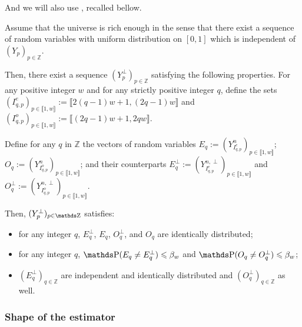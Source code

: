 And we will also use , recalled bellow.
\begin{lm*}
Assume that the universe is rich enough in the sense that there exist a sequence of random variables with uniform distribution on $[0,1]$ which is independent of $(Y_{p})_{p \in \mathds{Z}}$.

Then, there exist a sequence $(Y_{p}^{\perp})_{p \in \mathds{Z}}$ satisfying the following properties.
For any positive integer $w$ and for any strictly positive integer $q$, define the sets $(I_{q, p}^{e})_{p \in \llbracket 1, w\rrbracket} := \llbracket 2(q-1) w + 1, (2q - 1) w\rrbracket$ and $ (I_{q, p}^{o} )_{p \in \llbracket 1, w \rrbracket} := \llbracket (2q-1) w + 1, 2q w\rrbracket$.

Define for any $q$ in $\mathds{Z}$ the vectors of random variables $E_{q} := (Y_{I_{q, p}^{e}}^{n})_{p \in \llbracket 1, w \rrbracket}$; $O_{q} := (Y_{I_{q, p}^{o}}^{n})_{p \in \llbracket 1, w \rrbracket}$; and their counterparts $E_{q}^{\perp} := (Y_{I_{q, p}^{e}}^{n, \perp})_{p \in \llbracket 1, w \rrbracket}$ and $O_{q}^{\perp} := (Y_{I_{q, p}^{o}}^{n, \perp})_{p \in \llbracket 1, w \rrbracket}$.

Then, $ (Y^{\perp}_{p} )_{p \in \Z}$ satisfies:
\begin{itemize}
\item for any integer $q$, $E^{\perp}_{q}$, $E_{q}$, $O^{\perp}_{q}$, and $O_{q}$ are identically distributed;
\item for any integer $q$, $\P (E_{q} \neq E^{\perp}_{q} ) \leq \beta_{w}$ and $\P (O_{q} \neq O^{\perp}_{q} ) \leq \beta_{w}$;
\item $ (E^{\perp}_{q} )_{q \in \mathds{Z}}$ are independent and identically distributed and $ (O^{\perp}_{q} )_{q \in \mathds{Z}}$ as well.
\end{itemize}
\reEnd
\end{lm*}

\subsubsection{Shape of the estimator}

